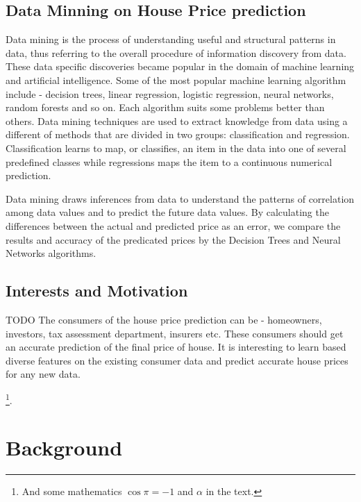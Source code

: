 \documentclass[fleqn,10pt]{SelfArx} %
\begin{document}
	
	\subsection{Data Minning on House Price prediction}
	Data mining is the process of understanding useful and structural patterns in data, thus referring to the overall procedure of information discovery from data. These data specific discoveries became popular in the domain of machine learning and artificial intelligence. Some of the most popular machine learning algorithm include - decision trees, linear regression, logistic regression, neural networks, random forests and so on. Each algorithm suits some problems better than others. Data mining techniques are used to extract knowledge from data using a different of methods that are divided in two groups: classification and regression. Classification learns to map, or classifies, an item in the data into one of several predefined classes while regressions maps the item to a continuous numerical prediction.
	
	Data mining draws inferences from data to understand the patterns of correlation among data values and to predict the future data values. By calculating the differences between the actual and predicted price as an error, we compare the results and accuracy of the predicated prices by the Decision Trees and Neural Networks algorithms. 
	
	\subsection{Interests and Motivation}
	TODO
	The consumers of the house price prediction can be - homeowners, investors, tax assessment department, insurers etc. These consumers should get an accurate prediction of the final price of house. It is interesting to learn based diverse features on the existing consumer data and predict accurate house prices for any new data.  
	
	\footnote{And some mathematics $\cos\pi=-1$ and $\alpha$ in the text.}.
	
	
	\section{Background}
	
\end{document}
